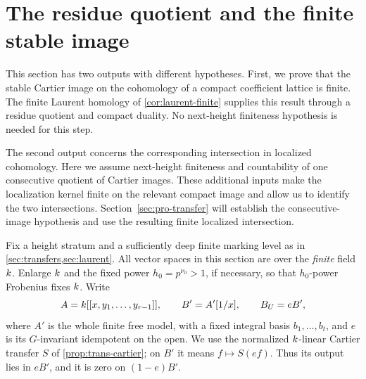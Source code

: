 \section{The residue quotient and the finite stable image}
\label{sec:cutoff}

This section has two outputs with different hypotheses. First, we prove
that the stable Cartier image on the cohomology of a compact coefficient
lattice is finite. The finite Laurent homology of
\cref{cor:laurent-finite} supplies this result through a residue
quotient and compact duality. No next-height finiteness hypothesis is
needed for this step.

The second output concerns the corresponding intersection in localized
cohomology. Here we assume next-height finiteness and countability of
one consecutive quotient of Cartier images. These additional inputs
make the localization kernel finite on the relevant compact image and
allow us to identify the two intersections. Section~\ref{sec:pro-transfer}
will establish the consecutive-image hypothesis and use the resulting
finite localized intersection.

Fix a height stratum and a sufficiently deep finite marking level as in
\cref{sec:transfers,sec:laurent}.  All vector spaces in this section are
over the \emph{finite} field $k$.  Enlarge $k$ and the fixed power
$h_0=p^{\nu_0}>1$, if necessary, so that $h_0$-power Frobenius fixes $k$.
Write
\[
 A=k[[x,y_1,\ldots,y_{r-1}]],\qquad
 B'=A'[1/x],\qquad B_U=eB',
\]
where $A'$ is the whole finite free model, with a fixed integral basis
$b_1,\ldots,b_t$, and $e$ is its $G$-invariant idempotent on the open.
We use the normalized $k$-linear Cartier transfer $S$ of
\cref{prop:trans-cartier}; on $B'$ it means $f\mapsto S(ef)$.
Thus its output lies in $eB'$, and it is zero on $(1-e)B'$.

